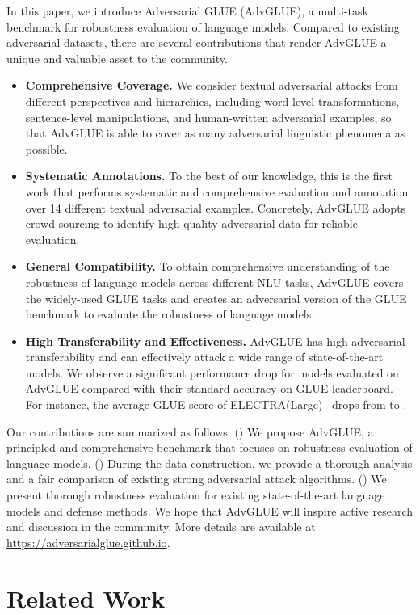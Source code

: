 \documentclass{article}
\newcommand{\method}{AdvGLUE\xspace}
\begin{document}
In this paper, we introduce Adversarial GLUE (\method), a multi-task benchmark for robustness evaluation of language models.
Compared to existing adversarial datasets, there are several contributions that render \method a unique and valuable asset to the community. 
\begin{itemize}[leftmargin=*]
    \item \textbf{Comprehensive Coverage.} We consider textual adversarial attacks from different perspectives and hierarchies, including word-level transformations, sentence-level manipulations, and human-written adversarial examples, so that \method is able to cover as many adversarial linguistic phenomena as possible.
    \item \textbf{Systematic Annotations.} 
    To the best of our knowledge, this is the first work that performs systematic and comprehensive evaluation and annotation over 14 different textual adversarial examples. Concretely, \method adopts  crowd-sourcing to identify high-quality adversarial data for reliable evaluation.
    \item \textbf{General Compatibility.} To obtain comprehensive understanding of the robustness of language models across different NLU tasks, \method covers the widely-used GLUE tasks and creates an adversarial version of the GLUE benchmark to evaluate the robustness of language models.
    \item \textbf{High Transferability and Effectiveness.} \method has high adversarial transferability and can effectively attack a wide range of  state-of-the-art models.  We observe a significant performance drop for models evaluated on \method  compared with their standard accuracy on GLUE leaderboard. For instance, the average GLUE score of ELECTRA(Large)~\cite{clark2020electra} drops from  to .
\end{itemize}

Our contributions are summarized as follows. () We propose \method, a principled and comprehensive benchmark  that focuses on  robustness evaluation of language models. () During the data construction, we provide a thorough analysis and a fair comparison of existing strong adversarial attack algorithms. () We present thorough robustness evaluation for existing state-of-the-art language models and defense methods.
We hope that \method will inspire active research and discussion in the community. More details are available at  \url{https://adversarialglue.github.io}.

\section{Related Work}
\end{document}
